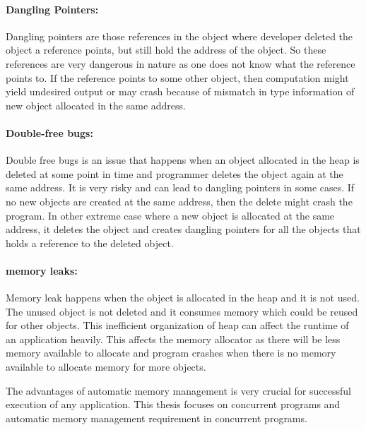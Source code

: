 \paragraph{Dangling Pointers:}
Dangling pointers are those references in
the object where developer deleted the object a reference points, but still hold the address of the object. So these references are very dangerous in nature as one does not know what the reference points to. If the reference points to some other object, then computation might yield undesired output or may crash because of mismatch in type information of new object allocated in the same address. 
\paragraph{Double-free bugs:}
Double free bugs is an issue that happens when an object allocated in the heap is deleted at some point in time and programmer deletes the object again at the same address. It is very risky and can lead to dangling pointers in some cases. If no new objects are created at the same address, then the delete might crash the program. In other extreme case where a new object is allocated at the same address, it deletes the object and creates dangling pointers for all the objects that holds a reference to the deleted object. 
\paragraph{memory leaks:}
Memory leak happens when the object is allocated in the heap and it is not used. The unused object is not deleted and it consumes memory which could be reused for other objects. This inefficient organization of heap can affect the runtime of an application heavily. This affects the memory allocator as there will be less memory available to allocate and program crashes when there is no memory available to allocate memory for more objects.

The advantages of automatic memory management is very crucial for successful execution of any application. This thesis focuses on concurrent programs and automatic memory management requirement in concurrent programs. 

